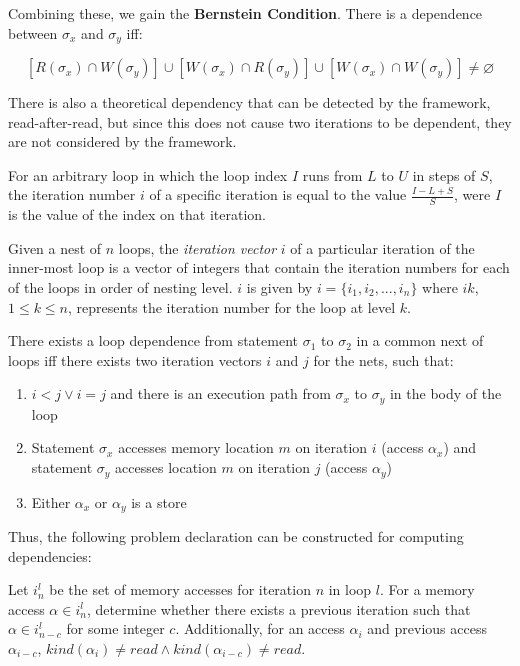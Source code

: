 	Combining these, we gain the \textbf{Bernstein Condition}. There is a dependence between $\sigma_x$ and $\sigma_y$ iff:
	
	\begin{equation} \label{eqn:bernstein}
	\left[ R(\sigma_x) \cap W(\sigma_y) \right] \cup \left[ W(\sigma_x) \cap R(\sigma_y) \right] \cup
	\left[ W(\sigma_x) \cap W(\sigma_y) \right] \neq \varnothing
	\end{equation}
	
	There is also a theoretical dependency that can be detected by the framework, read-after-read, but since this does not cause two iterations to be dependent, they are not considered by the framework.
	
	For an arbitrary loop in which the loop index $I$ runs from $L$ to $U$ in steps of $S$, the iteration number $i$ of a specific iteration is equal to the value $\frac{I-L+S}{S}$, were $I$ is the value of the index on that iteration.
	
	Given a nest of $n$ loops, the \textit{iteration vector} $i$ of a particular iteration of the inner-most loop is a vector of integers that contain the iteration numbers for each of the loops in order of nesting level. $i$ is given by $i=\{i_1, i_2, ..., i_n\}$ where $ik$, $1 \leq k \leq n$, represents the iteration number for the loop at level $k$.
	
	There exists a loop dependence from statement $\sigma_1$ to $\sigma_2$ in a common next of loops iff there exists two iteration vectors $i$ and $j$ for the nets, such that:
	
	\begin{enumerate}
		\item $i < j \lor i = j$ and there is an execution path from $\sigma_x$ to $\sigma_y$ in the body of the loop
		\item Statement $\sigma_x$ accesses memory location $m$ on iteration $i$ (access $\alpha_x$) and statement $\sigma_y$ accesses location $m$ on iteration $j$ (access $\alpha_y$)
		\item Either $\alpha_x$ or $\alpha_y$ is a store
	\end{enumerate}
	
	Thus, the following problem declaration can be constructed for computing dependencies:
	
	Let $i^l_n$ be the set of memory accesses for iteration $n$ in loop $l$. For a memory access $\alpha \in i^l_n$, determine whether there exists a previous iteration such that $\alpha \in i^l_{n-c}$ for some integer $c$. Additionally, for an access $\alpha_i$ and previous access $\alpha_{i-c}$, $kind(\alpha_i) \neq read \land kind(\alpha_{i-c}) \neq read$.
	
